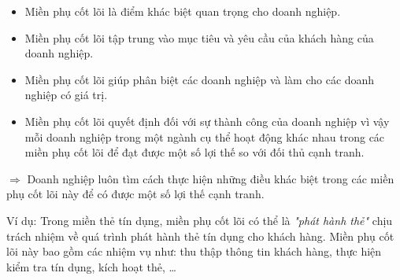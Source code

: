 \begin{itemize}

\item Miền phụ cốt lõi là điểm khác biệt quan trọng cho doanh nghiệp.

\item Miền phụ cốt lõi tập trung vào mục tiêu và yêu cầu của khách hàng của doanh nghiệp.

\item Miền phụ cốt lõi giúp phân biệt các doanh nghiệp và làm cho các doanh nghiệp có giá trị.

\item Miền phụ cốt lõi quyết định đối với sự thành công của doanh nghiệp vì vậy mỗi doanh nghiệp trong một ngành cụ thể hoạt động khác nhau trong các miền phụ cốt lõi để đạt được một số lợi thế so với đối thủ cạnh tranh.

\end{itemize}

$\Rightarrow$ Doanh nghiệp luôn tìm cách thực hiện những điều khác biệt trong các miền phụ cốt lõi này để có được một số lợi thế cạnh tranh.

Ví dụ: Trong miền thẻ tín dụng, miền phụ cốt lõi có thể là \textit{"phát hành thẻ"} chịu trách nhiệm về quá trình phát hành thẻ tín dụng cho khách hàng. Miền phụ cốt lõi này bao gồm các nhiệm vụ như: thu thập thông tin khách hàng, thực hiện kiểm tra tín dụng, kích hoạt thẻ, \dots

